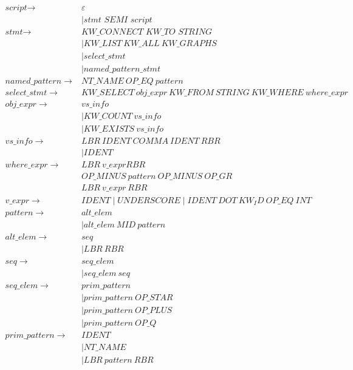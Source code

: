\begin{align*}
\textit{script} \to & \varepsilon  \\
                    & \mid \textit{stmt \ SEMI \ script} \\
\textit{stmt} \to & \textit{KW\_CONNECT \ KW\_TO \ STRING} \\
                  & \mid KW\_LIST \ KW\_ALL \ KW\_GRAPHS \\
                  & \mid select\_stmt \\
                  & \mid named\_pattern\_stmt \\
named\_pattern \to & NT\_NAME \ OP\_EQ  \ pattern \\
select\_stmt \to & \textit{KW\_SELECT} \ obj\_expr \ \textit{KW\_FROM} \ STRING \ \textit{KW\_WHERE} \ where\_expr \\
obj\_expr \to & vs\_info \\
              & \mid \textit{KW\_COUNT} \ vs\_info \\
              & \mid \textit{KW\_EXISTS} \ vs\_info \\
vs\_info \to & LBR \ IDENT \ COMMA \ IDENT \ RBR \\
             & \mid IDENT \\
where\_expr \to & LBR \ v\_expr RBR \ \\
                & OP\_MINUS \ pattern \ OP\_MINUS \ OP\_GR \\
                & LBR \ v\_expr \ RBR \\
v\_expr \to & IDENT \mid UNDERSCORE \mid IDENT \ DOT \ KW_ID \ OP\_EQ \ INT \\
pattern \to & alt\_elem \\
            & \mid alt\_elem \ MID \ pattern \\
alt\_elem \to & seq \\
             & \mid LBR \ RBR \\
seq \to & seq\_elem \\
        & \mid seq\_elem \ seq \\
seq\_elem \to & prim\_pattern \\
              & \mid prim\_pattern \ OP\_STAR \\
              & \mid prim\_pattern \ OP\_PLUS \\
              & \mid prim\_pattern \ OP\_Q \\
prim\_pattern \to & IDENT \\
                 & \mid NT\_NAME \\
                 & \mid LBR \ pattern \ RBR \\
\end{align*}

